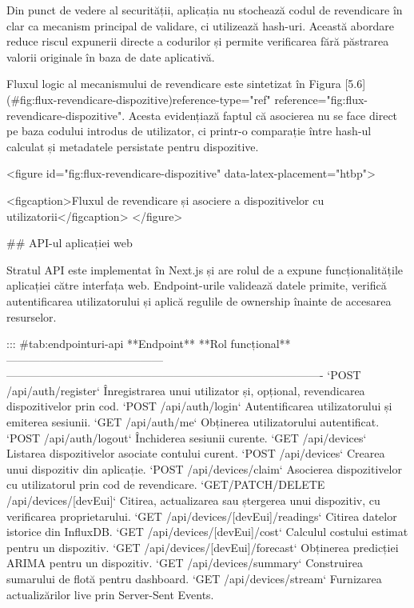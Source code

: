 Din punct de vedere al securității, aplicația nu stochează codul de
revendicare în clar ca mecanism principal de validare, ci utilizează
hash-uri. Această abordare reduce riscul expunerii directe a codurilor
și permite verificarea fără păstrarea valorii originale în baza de date
aplicativă.

Fluxul logic al mecanismului de revendicare este sintetizat în Figura
[5.6](#fig:flux-revendicare-dispozitive){reference-type="ref"
reference="fig:flux-revendicare-dispozitive"}. Acesta evidențiază faptul
că asocierea nu se face direct pe baza codului introdus de utilizator,
ci printr-o comparație între hash-ul calculat și metadatele persistate
pentru dispozitive.

<figure id="fig:flux-revendicare-dispozitive"
data-latex-placement="htbp">

<figcaption>Fluxul de revendicare și asociere a dispozitivelor cu
utilizatorii</figcaption>
</figure>

## API-ul aplicației web

Stratul API este implementat în Next.js și are rolul de a expune
funcționalitățile aplicației către interfața web. Endpoint-urile
validează datele primite, verifică autentificarea utilizatorului și
aplică regulile de ownership înainte de accesarea resurselor.

::: {#tab:endpointuri-api}
  **Endpoint**                               **Rol funcțional**
  ------------------------------------------ -------------------------------------------------------------------------------------
  `POST /api/auth/register`                  Înregistrarea unui utilizator și, opțional, revendicarea dispozitivelor prin cod.
  `POST /api/auth/login`                     Autentificarea utilizatorului și emiterea sesiunii.
  `GET /api/auth/me`                         Obținerea utilizatorului autentificat.
  `POST /api/auth/logout`                    Închiderea sesiunii curente.
  `GET /api/devices`                         Listarea dispozitivelor asociate contului curent.
  `POST /api/devices`                        Crearea unui dispozitiv din aplicație.
  `POST /api/devices/claim`                  Asocierea dispozitivelor cu utilizatorul prin cod de revendicare.
  `GET/PATCH/DELETE /api/devices/[devEui]`   Citirea, actualizarea sau ștergerea unui dispozitiv, cu verificarea proprietarului.
  `GET /api/devices/[devEui]/readings`       Citirea datelor istorice din InfluxDB.
  `GET /api/devices/[devEui]/cost`           Calculul costului estimat pentru un dispozitiv.
  `GET /api/devices/[devEui]/forecast`       Obținerea predicției ARIMA pentru un dispozitiv.
  `GET /api/devices/summary`                 Construirea sumarului de flotă pentru dashboard.
  `GET /api/devices/stream`                  Furnizarea actualizărilor live prin Server-Sent Events.

